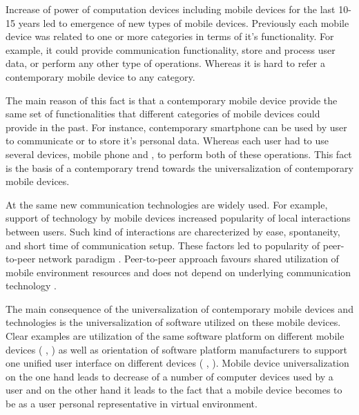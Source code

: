 %
Increase of power of computation devices including mobile devices for the last 10-15 years led to emergence of new types of mobile devices. 
%
Previously each mobile device was related to one or more categories in terms of it's functionality. 
%
For example, it could provide communication functionality, store and process user data, or perform any other type of operations. 
%
Whereas it is hard to refer a contemporary mobile device to any category. 

%
The main reason of this fact is that a contemporary mobile device provide the same set of functionalities that different categories of mobile devices could provide in the past. 
%
For instance, contemporary smartphone can be used by user to communicate or to store it's personal data. 
%
Whereas each user had to use several devices, mobile phone and , to perform both of these operations. 
%
This fact is the basis of a contemporary trend towards the universalization of contemporary mobile devices. 

%
At the same new communication technologies are widely used. 
%
For example, support of   technology by mobile devices increased popularity of local interactions between users. 
%
Such kind of interactions are charecterized by ease, spontaneity, and short time of communication setup. 
%
These factors led to popularity of peer-to-peer network paradigm . 
%
Peer-to-peer approach favours shared utilization of mobile environment resources and does not depend on underlying communication technology  . 

%
The main consequence of the universalization of contemporary mobile devices and technologies is the universalization of software utilized on these mobile devices. 
%
Clear examples are utilization of the same software platform on different mobile devices ( ,  ) as well as orientation of software platform manufacturers to support one unified user interface on different devices ( ,  ). 
%
Mobile device universalization on the one hand leads to decrease of a number of computer devices used by a user and on the other hand it leads to the fact that a mobile device becomes to be as a user personal representative in virtual environment. 

